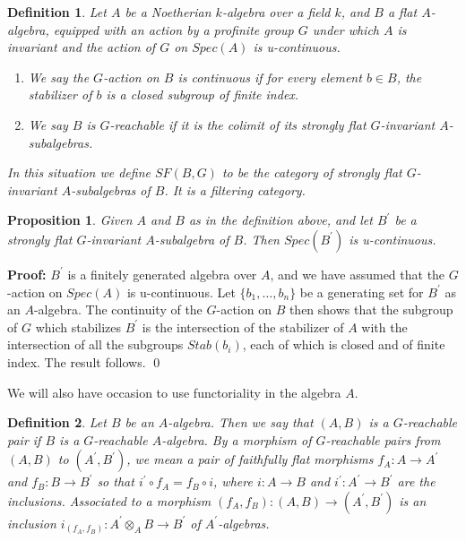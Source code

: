 \documentclass[11pt]{article}
\newtheorem{Proposition}{Proposition}[section]
\newtheorem{Definition}{Definition}[section]
\newenvironment{Proof}{\par\noindent\textbf{Proof:}}
{\qed}
\begin{document}
\begin{Definition}
    Let $A$ be a Noetherian $k$-algebra over a field $k$, and $B$  a flat   $A$-algebra, equipped with an action by a profinite group $G$  under which $A$ is invariant and the action of $G$ on  $Spec(A)$ is u-continuous.        
    \begin{enumerate}[label=(\arabic*), font=\upshape]
     \item{We say the $G$-action on $B$ is {\em  continuous } if for every element $b \in B$, the stabilizer of $b$ is a closed subgroup of finite index.}
    \item{We say $B$ is {\em $G$-reachable} if it is the colimit of its  strongly flat $G$-invariant $A$-subalgebras.   }
    \end{enumerate}
   In this situation we define $SF(B,G)$ to be the  category of strongly flat $G$-invariant $A$-subalgebras of $B$.  It is a filtering category. 
\end{Definition}
\begin{Proposition} \label{actiontrivial}
    Given $A$ and $B$ as in the definition above, and let $B^{\prime}$ be a strongly flat $G$-invariant $A$-subalgebra  of $B$.  Then $Spec(B^{\prime})$ is u-continuous.    
\end{Proposition}
\begin{Proof}
    $B^{\prime}$ is a finitely generated algebra over $A$, and we have assumed that the $G$-action on $Spec(A)$ is u-continuous. Let $\{ b_1, \ldots , b_n \}$ be a generating set for $B^{\prime}$ as an $A$-algebra.    The continuity of the $G$-action on $B$ then shows that the subgroup of $G$ which stabilizes $B^{\prime}$ is the intersection of the stabilizer of  $A$ with the  intersection of all the subgroups $Stab(b_i )$, each of which is closed and of finite index.  The result follows.  
\end{Proof}

We will also have occasion to use functoriality in the algebra $A$.
\begin{Definition} \label{specialty}
       Let $B$ be an $A$-algebra.  Then we say that $(A,B)$ is a {\em $G$-reachable pair}  if $B$ is a $G$-reachable $A$-algebra.  By a morphism of $G$-reachable pairs from $(A,B) $ to $(A^{\prime}, B^{\prime})$, we mean a pair of  faithfully flat morphisms $f_A: A \rightarrow A^{\prime}$ and $f_B: B \rightarrow B^{\prime} $ so that $i^{\prime} \circ  f_A = f_B \circ  i$, where $i:A \rightarrow B$ and $i^{\prime}: A ^{\prime} \rightarrow B^{\prime}$ are the inclusions. Associated to  a morphism $(f_A, f_B): (A,B) \rightarrow (A^{\prime}, B^{\prime}) $ is an inclusion $i_{(f_A, f_B)}: A^{\prime}   \otimes _{A} B\rightarrow B^{\prime}$ of $A^{\prime}$-algebras. 
       
        \end{Definition}
\end{document}
